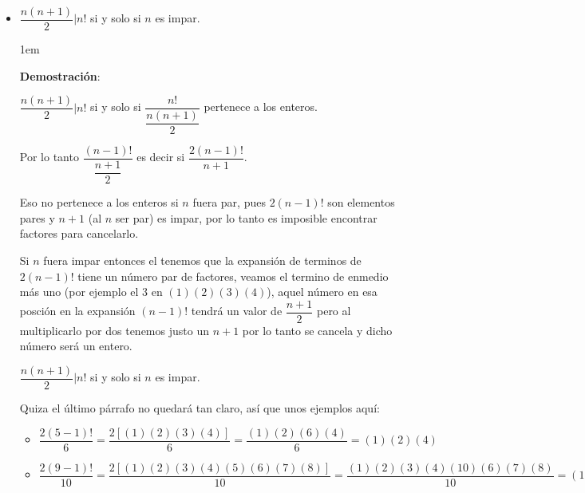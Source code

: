 \documentclass[12pt, fleqn]{report}                             %
\newenvironment{SmallIndentation}[1][0.75em]                    %
    {\begin{adjustwidth}{#1}{}\begin{footnotesize}}                 %
    {\end{footnotesize}\end{adjustwidth}}                           %
\begin{document}
\begin{itemize}
\begin{SmallIndentation}[1em]
                    Por lo tanto $(a^2,b^2)=(a,b)^2=(c,d)^2=(c^2,d^2)$.
                    Demostrado.
                
                \end{SmallIndentation}

            \item $\dfrac{n(n+1)}{2} | n! $ si y solo si $n$ es impar.

                \begin{SmallIndentation}[1em]
                    \textbf{Demostración}:

                    $\dfrac{n(n+1)}{2} | n!$ si y solo si $\dfrac{n!}{\dfrac{n(n+1)}{2}}$
                    pertenece a los enteros.

                    Por lo tanto $\dfrac{(n-1)!}{\dfrac{n+1}{2}}$ es decir
                    si $\dfrac{2(n-1)!}{n+1}$.

                    Eso no pertenece a los enteros si $n$ fuera par, pues $2(n-1)!$ son elementos
                    pares y $n+1$ (al $n$ ser par) es impar, por lo tanto es imposible encontrar
                    factores para cancelarlo.

                    Si $n$ fuera impar entonces el tenemos que la expansión de terminos de
                    $2(n-1)!$ tiene un número par de factores, veamos el termino de enmedio más
                    uno (por ejemplo el 3 en $(1)(2)(3)(4)$), aquel número en esa posción en la 
                    expansión $(n-1)!$ tendrá un valor de $\dfrac{n+1}{2}$ pero al multiplicarlo
                    por dos tenemos justo un $n+1$ por lo tanto se cancela y dicho número será
                    un entero.

                    $\dfrac{n(n+1)}{2} | n! $ si y solo si $n$ es impar.

                    Quiza el último párrafo no quedará tan claro, así que unos ejemplos aquí:

                    \begin{itemize}
                        \item 
                            $\dfrac{2(5-1)!}{6} 
                                = \dfrac{2[(1)(2)(3)(4)]}{6} 
                                = \dfrac{(1)(2)(6)(4)}{6}
                                = (1)(2)(4)$

                        \item 
                            $\dfrac{2(9-1)!}{10} 
                                = \dfrac{2[(1)(2)(3)(4)(5)(6)(7)(8)]}{10} 
                                = \dfrac{(1)(2)(3)(4)(10)(6)(7)(8)}{10} 
                                = (1)(2)(3)(4)(6)(7)(8)$


\end{itemize}
\end{SmallIndentation}
\end{itemize}
\end{document}
